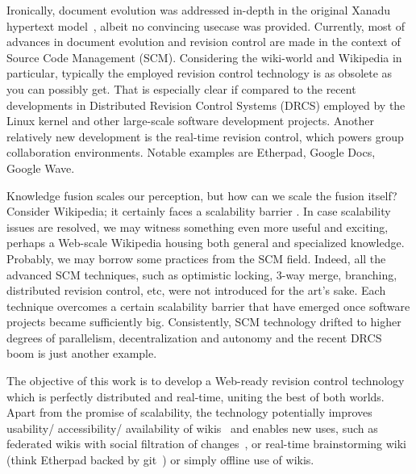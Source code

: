 \documentclass{sig-alternate}
\begin{document}
Ironically, document evolution was addressed in-depth in the original Xanadu hypertext model~\cite{literary}, albeit no convincing usecase was provided.
Currently, most of advances in document evolution and revision control are made in the context of Source Code Management (SCM).
Considering the wiki-world and Wikipedia in particular, typically the employed revision control technology is as obsolete as you can possibly get.
That is especially clear if compared to the recent developments in Distributed Revision Control Systems (DRCS) employed by the Linux kernel and other large-scale software development projects.
Another relatively new development is the real-time revision control, which powers group collaboration environments. Notable examples are Etherpad, Google Docs, Google Wave.

Knowledge fusion scales our perception, but how can we scale the fusion itself?
Consider Wikipedia; it certainly faces a scalability barrier \cite{no-singularity, wp-decay}.
In case scalability issues are resolved, we may witness something even more useful and exciting, perhaps a Web-scale Wikipedia housing both general and specialized knowledge.
Probably, we may borrow some practices from the SCM field.
Indeed, all the advanced SCM techniques, such as optimistic locking, 3-way merge, branching, distributed revision control, etc, were not introduced for the art's sake.
Each technique overcomes a certain scalability barrier that have emerged once software projects became sufficiently big.
Consistently, SCM technology drifted to higher degrees of parallelism, decentralization and autonomy and the recent DRCS boom is just another example.

The objective of this work is to develop a Web-ready revision control technology which is perfectly distributed and real-time, uniting the best of both worlds.
Apart from the promise of scalability, the technology potentially improves usability/ accessibility/ availability of wikis~\cite{nahaboo} and enables new uses, such as federated wikis with social filtration of changes~\cite{www06}, or real-time brainstorming wiki (think Etherpad backed by git~\cite{git}) or simply offline use of wikis.
\end{document}
